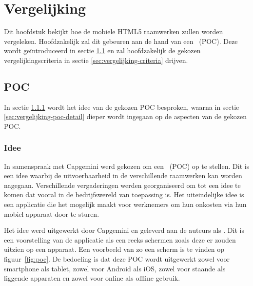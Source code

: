 \chapter{Vergelijking}
\label{chap:vergelijking}

Dit hoofdstuk bekijkt hoe de mobiele HTML5 raamwerken zullen worden vergeleken.
Hoofdzakelijk zal dit gebeuren aan de hand van een ~(POC).
Deze wordt geïntroduceerd in sectie \ref{sec:vergelijking-poc} en zal hoofdzakelijk de gekozen vergelijkingscriteria in sectie \ref{sec:vergelijking-criteria} drijven.


\section{POC}
\label{sec:vergelijking-poc}
In sectie \ref{sec:vergelijking-poc-idee} wordt het idee van de gekozen POC besproken, waarna in sectie \ref{sec:vergelijking-poc-detail} dieper wordt ingegaan op de aspecten van de gekozen POC.

\subsection{Idee}
\label{sec:vergelijking-poc-idee}

In samenspraak met Capgemini werd gekozen om een ~(POC) op te stellen.
Dit is een idee waarbij de uitvoerbaarheid in de verschillende raamwerken kan worden nagegaan.
Verschillende vergaderingen werden georganiseerd om tot een idee te komen dat vooral in de bedrijfswereld van toepassing is.
Het uiteindelijke idee is een applicatie die het mogelijk maakt voor werknemers om hun onkosten via hun mobiel apparaat door te sturen.

Het idee werd uitgewerkt door Capgemini en geleverd aan de auteurs als .
Dit is een voorstelling van de applicatie als een reeks schermen zoals deze er zouden uitzien op een apparaat. 
Een voorbeeld van zo een scherm is te vinden op figuur~\ref{fig:poc}. 
De bedoeling is dat deze POC wordt uitgewerkt zowel voor smartphone als tablet, zowel voor Android als iOS, zowel voor staande als liggende apparaten en zowel voor online als offline gebruik.

